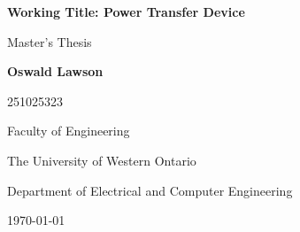 \begin{titlepage}
    \begin{center}
        \vspace*{2cm}

        \LARGE
        \textbf{Working Title: Power Transfer Device}

        \vspace{0.5cm}
        \large
        Master's Thesis

        \vspace{1.5cm}
        
        \Large
        \textbf{Oswald Lawson}
        
        \vspace{0.5cm}

       \large
        251025323
        
        \vfill

        Faculty of Engineering

        \vspace{0.25cm}
        The University of Western Ontario

        \vspace{0.25cm}
        Department of Electrical and Computer Engineering

        \vspace{0.25cm}
        

        \vspace{0.25cm}
        \today
 
    \end{center}
\end{titlepage}